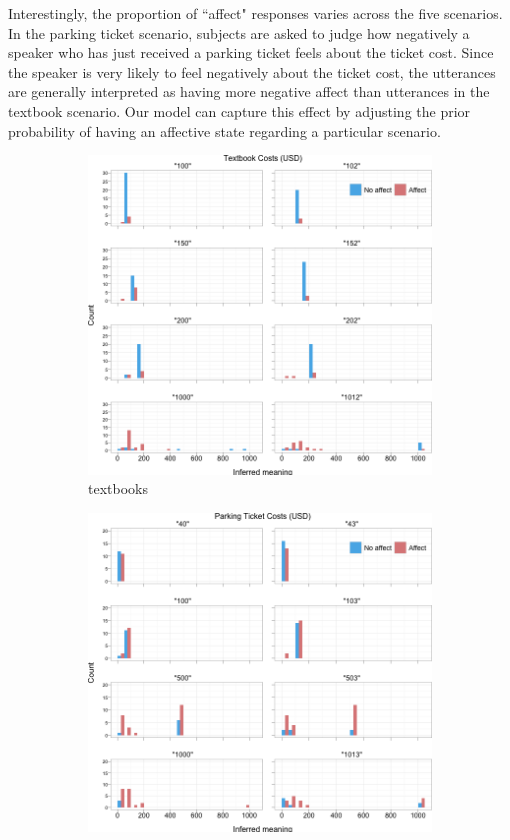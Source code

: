 \documentclass{article} %
\begin{document}
Interestingly, the proportion of ``affect" responses varies across the five scenarios. In the parking ticket scenario, subjects are asked to judge how negatively a speaker who has just received a parking ticket feels about the ticket cost. Since the speaker is very likely to feel negatively about the ticket cost, the utterances are generally interpreted as having more negative affect than utterances in the textbook scenario. Our model can capture this effect by adjusting the prior probability of having an affective state regarding a particular scenario. 
\begin{figure}[t]
        \begin{subfigure}[b]{0.5\textwidth}
                \centering
		\includegraphics[width=\textwidth]{humans_all_textbook.png}
		\caption{textbooks}
	\end{subfigure}
        \begin{subfigure}[b]{0.5\textwidth}
                \centering
                \includegraphics[width=\textwidth]{humans_all_ticket.png}

\end{subfigure}
\end{figure}
\end{document}
